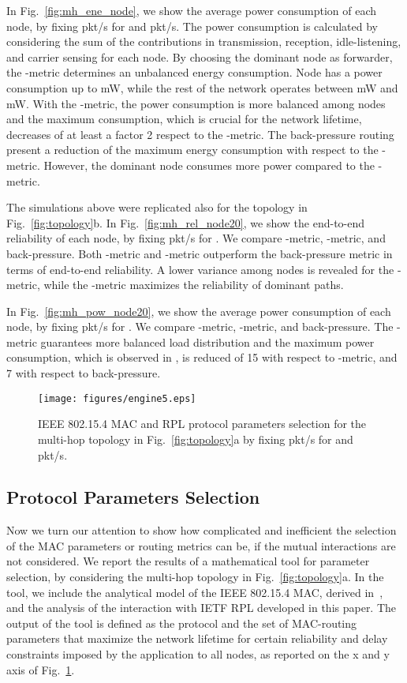 \documentclass[review, 1p, 11pt]{elsarticle}
\numberwithin{equation}{section}
\begin{document}
In Fig.~\ref{fig:mh_ene_node}, we show the average power consumption of each node, by fixing  pkt/s for  and  pkt/s.
The power consumption is calculated by considering the sum of the contributions in transmission, reception, idle-listening, and carrier sensing for each node.
By choosing the dominant node  as forwarder, the -metric determines an unbalanced energy consumption. Node  has a power consumption up to  mW, while the rest of the network operates between  mW and  mW. With the -metric, the power consumption is more balanced among nodes and the maximum consumption, which is crucial for the network lifetime, decreases of at least a factor 2 respect to the -metric. The back-pressure routing present a reduction of the maximum energy consumption with respect to the -metric. However, the dominant node  consumes  more power compared to the -metric.


The simulations above were replicated also for the topology in Fig.~\ref{fig:topology}b.
In Fig.~\ref{fig:mh_rel_node20}, we show the end-to-end reliability of each node, by fixing  pkt/s for . We compare -metric, -metric, and back-pressure. Both -metric and -metric outperform the back-pressure metric in terms of end-to-end reliability. A lower variance among nodes is revealed for the -metric, while the -metric maximizes the reliability of dominant paths.

In Fig.~\ref{fig:mh_pow_node20}, we show the average power consumption of each node, by fixing  pkt/s for . We compare -metric, -metric, and back-pressure.
The -metric guarantees more balanced load distribution and the maximum power consumption, which is observed in , is reduced of 15 with respect to -metric, and 7 with respect to back-pressure.

\begin{figure}[h!]\centering
  \texttt{[image: figures/engine5.eps]}
  \caption{IEEE 802.15.4 MAC and RPL protocol parameters selection for the multi-hop topology in Fig.~\ref{fig:topology}a by fixing  pkt/s for  and  pkt/s.}\label{fig:selection}
\end{figure}


\subsection{Protocol Parameters Selection}


Now we turn our attention to show how complicated and inefficient the selection of the MAC parameters or routing metrics can be, if the mutual interactions are not considered.
We report the results of a mathematical tool for
parameter selection, by considering the multi-hop topology in Fig.~\ref{fig:topology}a.
In the tool, we include the analytical model of the IEEE 802.15.4 MAC, derived in~\cite{PG_TVT},
and the analysis of the interaction with IETF RPL developed in this paper.
The output of the tool is defined as the protocol and the set of MAC-routing parameters
that maximize the network lifetime for certain reliability
and delay constraints imposed by the application to all nodes, as reported
on the x and y axis of Fig.~\ref{fig:selection}.
\end{document}
